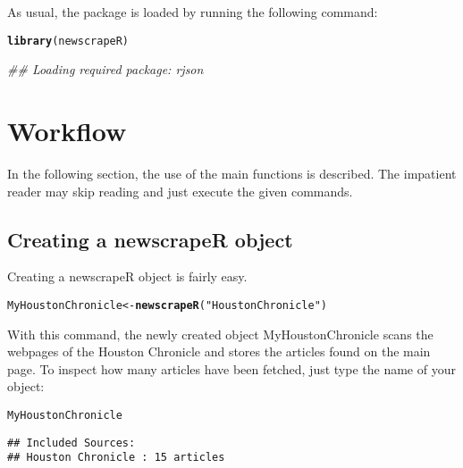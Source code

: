 \documentclass[a4paper,11pt]{article}\usepackage{graphicx, color}
\makeatletter
\newcommand{\hlfunctioncall}[1]{\textcolor[rgb]{0.501960784313725,0,0.329411764705882}{\textbf{#1}}}%
\newcommand{\hlstring}[1]{\textcolor[rgb]{0.6,0.6,1}{#1}}%
\newenvironment{kframe}{%
 \def\at@end@of@kframe{}%
 \ifinner\ifhmode%
  \def\at@end@of@kframe{\end{minipage}}%
  \begin{minipage}{\columnwidth}%
 \fi\fi%
 \def\FrameCommand##1{\hskip\@totalleftmargin \hskip-\fboxsep
 \colorbox{shadecolor}{##1}\hskip-\fboxsep
     \hskip-\linewidth \hskip-\@totalleftmargin \hskip\columnwidth}%
 \MakeFramed {\advance\hsize-\width
   \@totalleftmargin\z@ \linewidth\hsize
   \@setminipage}}%
 {\par\unskip\endMakeFramed%
 \at@end@of@kframe}
\newenvironment{knitrout}{}{} %
\makeatother
\begin{document}
As usual, the package is loaded by running the following command:

\begin{knitrout}
\color{fgcolor}\begin{kframe}
\begin{alltt}
\hlfunctioncall{library}(newscrapeR)
\end{alltt}


{\ttfamily\noindent\itshape\textcolor{messagecolor}{\#\# Loading required package: rjson}}\end{kframe}
\end{knitrout}


\section{Workflow}
In the following section, the use of the main functions is described. The impatient reader may skip reading and just execute the given commands. 

\subsection{Creating a newscrapeR object}

Creating a newscrapeR object is fairly easy. 

\begin{knitrout}
\color{fgcolor}\begin{kframe}
\begin{alltt}
MyHoustonChronicle <- \hlfunctioncall{newscrapeR}(\hlstring{"Houston Chronicle"})
\end{alltt}
\end{kframe}
\end{knitrout}




With this command, the newly created object MyHoustonChronicle scans the webpages of the Houston Chronicle and stores the articles found on the main page. To inspect how many articles have been fetched, just type the name of your object:

\begin{knitrout}
\color{fgcolor}\begin{kframe}
\begin{alltt}
MyHoustonChronicle
\end{alltt}
\begin{verbatim}
## Included Sources: 
## Houston Chronicle : 15 articles
\end{verbatim}
\end{kframe}
\end{knitrout}
\end{document}

